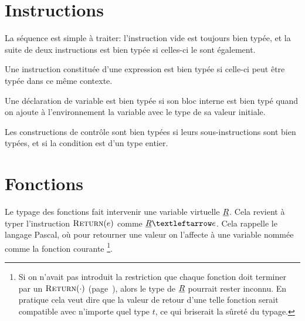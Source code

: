 \begin{mathpar}
\end{mathpar}

\section{Instructions}

La séquence est simple à traiter: l'instruction vide est toujours bien typée,
et la suite de deux instructions est bien typée si celles-ci le sont également.

\begin{mathpar}

\end{mathpar}

Une instruction constituée d'une expression est bien typée si celle-ci peut être
typée dans ce même contexte.

\begin{mathpar}
\end{mathpar}

Une déclaration de variable est bien typée si son bloc interne est bien typé
quand on ajoute à l'environnement la variable avec le type de sa valeur
initiale.

\begin{mathpar}
\end{mathpar}

Les constructions de contrôle sont bien typées si leurs sous-instructions sont
bien typées, et si la condition est d'un type entier.

\begin{mathpar}

\end{mathpar}

\section{Fonctions}
\label{sec:typ-fun}

Le typage des fonctions fait intervenir une variable virtuelle $\vRet$. Cela
revient à typer l'instruction $\iReturn{e}$ comme $\vRet ← e$. Cela rappelle le
langage Pascal, où pour retourner une valeur on l'affecte à une variable nommée
comme la fonction courante
\footnote{
    Si on n'avait pas introduit la restriction que chaque fonction doit terminer
    par un $\iReturn{\cdot}$ (page~\pageref{page:return-fonction}), alors le type de
    $\vRet$ pourrait rester inconnu. En pratique cela veut dire que la valeur de
    retour d'une telle fonction serait compatible avec n'importe quel type $t$, ce
    qui briserait la sûreté du typage.
}.

